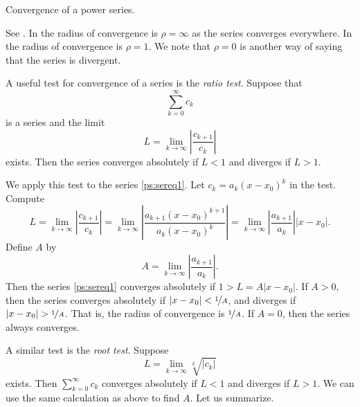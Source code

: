 \begin{myfig}
\capstart
{}
\caption{Convergence of a power series.\label{ps:convfig}}
\end{myfig}

See .
In  the radius of convergence is $\rho = \infty$
as the series converges everywhere.  In 
the radius of convergence is $\rho=1$.
We note that $\rho = 0$ is another way of saying that the series is
divergent.

A useful test for convergence of a series is the
\emph{ratio test}.  Suppose that
\begin{equation*}
\sum_{k=0}^\infty c_k
\end{equation*}
is a series and the limit
\begin{equation*}
L = \lim_{k\to\infty} \left \lvert \frac{c_{k+1}}{c_k} \right \rvert
\end{equation*}
exists.  Then the series converges absolutely if $L < 1$ and diverges
if $L > 1$.

We apply this test to the series \eqref{ps:sereq1}. 
Let $c_k = a_k {(x - x_0)}^k$ in the test.  Compute
\begin{equation*}
L = \lim_{k\to\infty} \left \lvert \frac{c_{k+1}}{c_k} \right \rvert
=
\lim_{k\to\infty} \left \lvert
\frac{a_{k+1} {(x - x_0)}^{k+1}}{a_k {(x - x_0)}^k}
\right \rvert
=
\lim_{k\to\infty} \left \lvert
\frac{a_{k+1}}{a_k}
\right \rvert
\lvert  x - x_0 \rvert .
\end{equation*}
Define $A$ by
\begin{equation*}
A =
\lim_{k\to\infty} \left \lvert
\frac{a_{k+1}}{a_k}
\right \rvert .
\end{equation*}
Then the series \eqref{ps:sereq1}
converges absolutely if $1 > L = A \lvert x - x_0 \rvert$.
If $A > 0$, then
the series converges absolutely
if $\lvert x - x_0 \rvert < \nicefrac{1}{A}$,
and diverges if $\lvert x - x_0 \rvert > \nicefrac{1}{A}$.  That is,
the radius of convergence is $\nicefrac{1}{A}$.
If $A = 0$, then the series always converges.

A similar test is the \emph{root test}.
Suppose
\begin{equation*}
L = \lim_{k\to\infty} \sqrt[k]{\lvert c_k \rvert}
\end{equation*}
exists.  Then $\sum_{k=0}^\infty c_k$ converges absolutely if $L < 1$
and diverges if $L > 1$.  We can use the same calculation as above
to find $A$.
Let us summarize.

